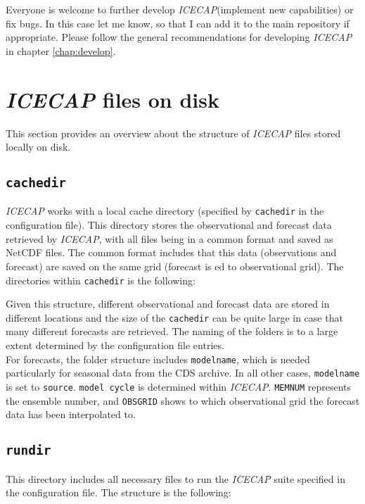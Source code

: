 \documentclass[DIV=10, parskip=full]{scrreprt}
\newcommand{\ice}{\textit{ICECAP}\xspace}
\begin{document}
Everyone is welcome to further develop \ice (implement new capabilities) or fix bugs. In this case let me know, so that I can add it to the main repository if appropriate. Please follow the general recommendations for developing \ice in chapter \ref{chap:develop}.


\chapter{\ice files on disk} \label{chap:files}
This section provides an overview about the structure of \ice files stored locally on disk. 

\section{\texttt{cachedir}}

\ice works with a local cache directory (specified by \texttt{cachedir} in the configuration file). This directory stores the observational and forecast data retrieved by \ice, with all files being in a common format and saved as NetCDF files. The common format includes that this data (observations and forecast) are saved on the same grid (forecast is ed to observational grid). The directories within \texttt{cachedir} is the following:




Given this structure, different observational and forecast data are stored in different locations and the size of the \texttt{cachedir} can be quite large in case that many different forecasts are retrieved. The naming of the folders is to a large extent determined by the configuration file entries.\\
For forecasts, the folder structure includes \texttt{modelname}, which is needed particularly for seasonal data from the CDS archive. In all other cases, \texttt{modelname} is set to \texttt{source}. \texttt{model cycle} is determined within \ice. \texttt{MEMNUM} represents the ensemble number, and \texttt{OBSGRID} shows to which observational grid the forecast data has been interpolated to. 
	
\section{\texttt{rundir}}
This directory includes all necessary files to run the \ice suite specified in the configuration file. The structure is the following:
\end{document}
